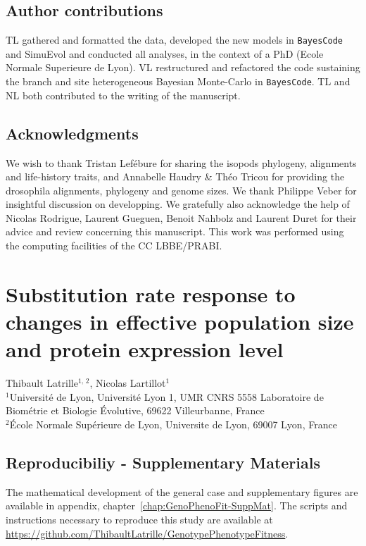 \documentclass[a4paper,oneside,nobind]{thesis}
\begin{document}
\section{Author contributions}
TL gathered and formatted the data, developed the new models in \texttt{BayesCode} and SimuEvol and conducted all analyses, in the context of a PhD (Ecole Normale Superieure de Lyon).
VL restructured and refactored the code sustaining the branch and site heterogeneous Bayesian Monte-Carlo in \texttt{BayesCode}.
TL and NL both contributed to the writing of the manuscript.

\section{Acknowledgments}
We wish to thank Tristan Lefébure for sharing the isopods phylogeny, alignments and life-history traits, and Annabelle Haudry \& Théo Tricou for providing the drosophila alignments, phylogeny and genome sizes.
We thank Philippe Veber for insightful discussion on developping.
We gratefully also acknowledge the help of Nicolas Rodrigue, Laurent Gueguen, Benoit Nahbolz and Laurent Duret for their advice and review concerning this manuscript.
This work was performed using the computing facilities of the CC LBBE/PRABI.

\thispagestyle{empty}
\chapter[Substitution rate susceptibility]{Substitution rate response to changes in effective population size and protein expression level}
\label{chap:GenoPhenoFit}

\begin{center}
	\Large Thibault Latrille$^{\text{1, 2}}$, Nicolas Lartillot$^{\text{1}}$\\
	\vspace{0.5cm}
	\normalsize
	$^{\text{1}}$Université de Lyon, Université Lyon 1, UMR CNRS 5558 Laboratoire de Biométrie et Biologie Évolutive, 69622 Villeurbanne, France\\
	$^{\text{2}}$École Normale Supérieure de Lyon, Universite de Lyon, 69007 Lyon, France\\
\end{center}

{\hypersetup{linkcolor=GREYDARK}\minitoc}



\section{Reproducibiliy - Supplementary Materials}
The mathematical development of the general case and supplementary figures are available in appendix, chapter~\ref{chap:GenoPhenoFit-SuppMat}.
The scripts and instructions necessary to reproduce this study are available at \url{https://github.com/ThibaultLatrille/GenotypePhenotypeFitness}.
\end{document}
